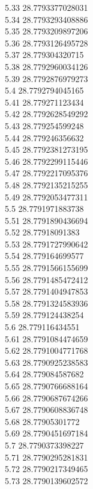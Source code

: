 {5.33	28.7793377028031\\
5.34	28.7793293408886\\
5.35	28.7793209897206\\
5.36	28.7793126495728\\
5.37	28.779304320715\\
5.38	28.7792960034126\\
5.39	28.7792876979273\\
5.4	28.7792794045165\\
5.41	28.779271123434\\
5.42	28.7792628549292\\
5.43	28.779254599248\\
5.44	28.779246356632\\
5.45	28.7792381273195\\
5.46	28.7792299115446\\
5.47	28.7792217095376\\
5.48	28.7792135215255\\
5.49	28.7792053477311\\
5.5	28.7791971883738\\
5.51	28.7791890436694\\
5.52	28.77918091383\\
5.53	28.7791727990642\\
5.54	28.779164699577\\
5.55	28.7791566155699\\
5.56	28.7791485472412\\
5.57	28.7791404947853\\
5.58	28.7791324583936\\
5.59	28.779124438254\\
5.6	28.779116434551\\
5.61	28.7791084474659\\
5.62	28.7791004771768\\
5.63	28.7790925238583\\
5.64	28.779084587682\\
5.65	28.7790766688164\\
5.66	28.7790687674266\\
5.67	28.7790608836748\\
5.68	28.77905301772\\
5.69	28.7790451697184\\
5.7	28.7790373398227\\
5.71	28.7790295281831\\
5.72	28.7790217349465\\
5.73	28.7790139602572\\
}
